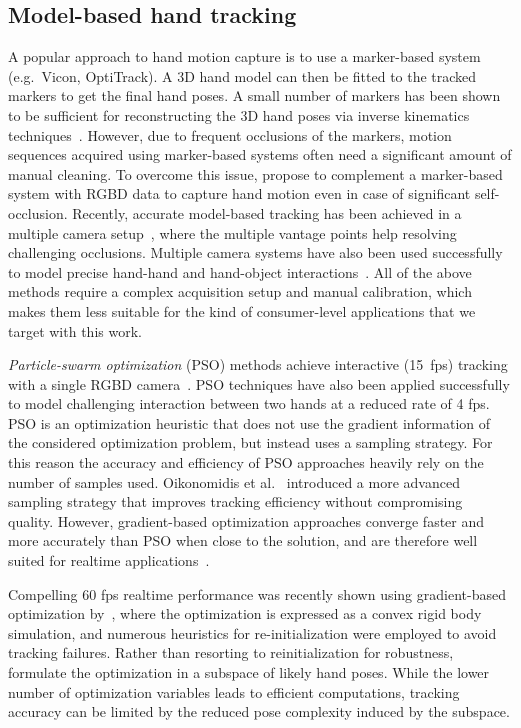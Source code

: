 \subsection*{Model-based hand tracking}

A popular approach to hand motion capture is to use a marker-based system (e.g.\ Vicon, OptiTrack).  A 3D hand model can then be fitted to the tracked markers to get the final hand poses. A small number of markers has been shown to be sufficient for reconstructing the 3D hand poses via inverse kinematics techniques~\cite{Hoyet_i3d12}. However, due to frequent occlusions of the markers, motion sequences acquired using marker-based systems often need a significant amount of manual cleaning. To overcome this issue, \cite{zhao2012marker} propose to complement a marker-based system with RGBD data to capture hand motion even in case of significant self-occlusion.
Recently, accurate model-based tracking has been achieved in a multiple camera setup~\cite{sridhar2013multicam,sridhar2014anisotropic}, where the multiple vantage points help resolving challenging occlusions. Multiple camera systems have also been used successfully to model precise hand-hand and hand-object interactions~\cite{oiko_iccv11,ballan2013salient,wang2013physics}. All of the above methods require a complex acquisition setup and manual calibration, which makes them less suitable for the kind of consumer-level applications that we target with this work.

\emph{Particle-swarm optimization} (PSO) methods achieve interactive (15~fps) tracking with a single RGBD camera~\cite{oiko2011hand}. PSO techniques have also been applied successfully to model challenging interaction between two hands \cite{oiko_cvpr12} at a reduced rate of 4 fps. 
PSO is an optimization heuristic that does not use the gradient information of the considered optimization problem, but instead uses a sampling strategy.
For this reason the accuracy and efficiency of PSO approaches heavily rely on the number of samples used. Oikonomidis et al.~\cite{oikonomidis2014evolutionary} introduced a more advanced sampling strategy that improves tracking efficiency without compromising quality. However, gradient-based optimization approaches  converge faster and more accurately than PSO when close to the solution, and are therefore well suited for realtime applications~\cite{qian2014realtime}.


Compelling 60 fps realtime performance was recently shown using gradient-based optimization by~\cite{melax2013dynamics}, where the optimization is expressed as a convex rigid body simulation, and numerous heuristics for re-initialization were employed to avoid tracking failures. Rather than resorting to reinitialization for robustness, \cite{schroder2014real} formulate the optimization in a subspace of likely hand poses. While the lower number of optimization variables leads to efficient computations, tracking accuracy can be limited by the reduced pose complexity induced by the subspace.


